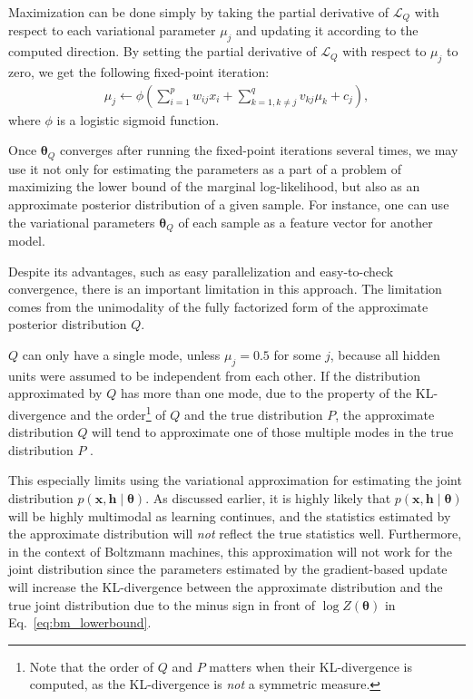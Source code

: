 \documentclass{now}
\newcommand{\vect}[1]{\mathbf{#1}}
\newcommand{\vects}[1]{\boldsymbol{#1}}
\newcommand{\vh}[0]{\vect{h}}
\newcommand{\vx}[0]{\vect{x}}
\newcommand{\TT}[0]{{\vects{\theta}}}
\newcommand{\LL}[0]{\mathcal{L}}
\begin{document}
Maximization can be done simply by taking the
partial derivative of $\LL_Q$ with respect to each variational
parameter $\mu_j$ and updating it according to the computed
direction. By setting the partial derivative of $\LL_Q$ with
respect to $\mu_j$ to zero, we get the following fixed-point
iteration:
\begin{align}
    \label{eq:vari_update}
    \mu_j \leftarrow \phi\left(\sum_{i=1}^p w_{ij} x_i +
    \sum_{k=1, k\neq j}^q v_{kj} \mu_k + c_j\right),
\end{align}
where $\phi$ is a logistic sigmoid function.

Once $\TT_Q$ converges after running the fixed-point
iterations several times, we may use it not only for
estimating the parameters as a part of a problem of
maximizing the lower bound of the marginal log-likelihood,
but also as an approximate posterior distribution of a given
sample. For instance, one can use the variational parameters
$\TT_Q$ of each sample as a feature vector for another
model.

Despite its advantages, such as easy parallelization and
easy-to-check convergence, there is an important limitation
in this approach. The limitation comes from the unimodality
of the fully factorized form of the approximate posterior
distribution $Q$.

$Q$ can only have a single mode, unless $\mu_j=0.5$ for some $j$,
because all hidden units were assumed to be independent from
each other. If the distribution approximated
by $Q$ has more than one mode, due to the property of the
KL-divergence and the order\footnote{Note that the order of
$Q$ and $P$ matters when their KL-divergence is computed, as
the KL-divergence is \textit{not} a symmetric measure.} of
$Q$ and the true distribution $P$, the approximate
distribution $Q$ will tend to approximate one of those
multiple modes in the true distribution $P$
\citep[see][Section 21.2.2 for more details]{Murphy2012}.

This especially limits using the variational approximation
for estimating the joint distribution ${p(\vx, \vh \mid
\TT)}$. As discussed earlier, it is highly likely that
${p(\vx, \vh \mid \TT)}$ will be highly multimodal as
learning continues, and the statistics estimated by the
approximate distribution will \textit{not} reflect the true
statistics well. Furthermore, in the context of Boltzmann
machines, this approximation will not work for the joint
distribution since the parameters estimated by the
gradient-based update will increase the KL-divergence
between the approximate distribution and the true joint
distribution due to the minus sign in front of $\log Z(\TT)$
in Eq.~\eqref{eq:bm_lowerbound}.
\end{document}
